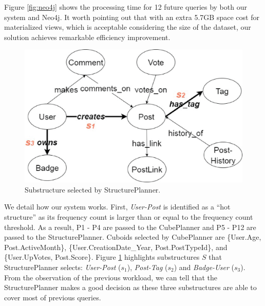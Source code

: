 Figure \ref{fig:neo4j} shows the processing time for 12 future queries by both our system and Neo4j. It worth pointing out that with an extra 5.7GB space cost for materialized views, which is acceptable considering the size of the dataset, our solution achieves remarkable efficiency improvement.

\begin{figure}[H]
	\centering
	\includegraphics[scale=0.5]{pic/MetaSExp.eps}
	\caption{Substructure selected by StructurePlanner.}
	\label{fig:metagraphexperimenthot}
\end{figure}

We detail how our system works. First, \textit{User-Post} is identified as a ``hot structure'' as its frequency count is larger than or equal to the frequency count threshold. As a result, P1 - P4 are passed to the CubePlanner and P5 - P12 are passed to the StructurePlanner. Cuboids selected by CubePlanner are \{User.Age, Post.ActiveMonth\}, \{User.CreationDate\_Year, Post.PostTypeId\}, and \{User.UpVotes, Post.Score\}. Figure \ref{fig:metagraphexperimenthot} highlights substructures $S$ that StructurePlanner selects:  \textit{User-Post} ($s_1$), \textit{Post-Tag} ($s_2$) and \textit{Badge-User} ($s_3$). From the observation of the previous workload, we can tell that the StructurePlanner makes a good decision as these three substructures are able to cover most of previous queries.

